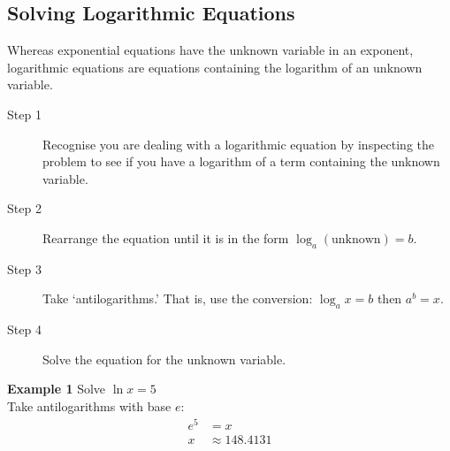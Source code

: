 \subsection*{Solving Logarithmic Equations}
Whereas exponential equations have the unknown variable in an exponent, logarithmic equations are equations containing the logarithm of an unknown variable. 
\begin{tcolorbox}
\begin{description}
	\item [Step 1] Recognise you are dealing with a logarithmic equation by inspecting the problem to see if you have a logarithm of a term containing the unknown variable. 	
	\item [Step	2] Rearrange the equation until it is in the form $\log _{a} \left (\text{unknown}\right ) =b$. 	
	\item [Step 3] Take	`antilogarithms.' That is, use the conversion: $\log _{a}x=b$ then $a^b=x$. 	
	\item [Step 4] Solve the equation for the unknown variable.
\end{description}
\end{tcolorbox}


\textbf{Example 1} Solve $\ln  x =5$\medskip\\
\solution Take antilogarithms with base $e$:
\begin{align*}e^{5} &  = x \\
x &  \approx 148.4131\end{align*}

